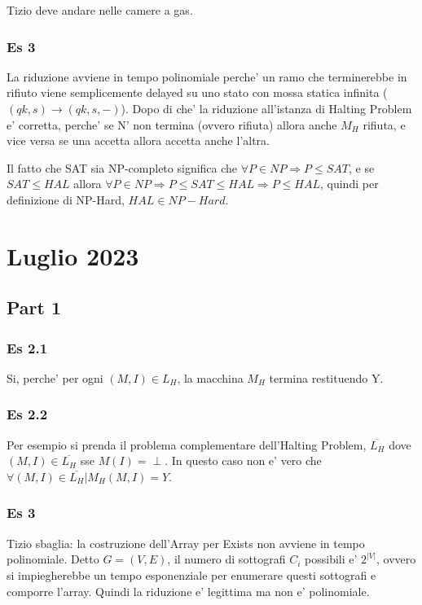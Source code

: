 \documentclass[a4paper,10pt,oneside]{book}
\begin{document}
Tizio deve andare nelle camere a gas.

\subsection{Es 3}

La riduzione avviene in tempo polinomiale perche' un ramo che terminerebbe in rifiuto viene semplicemente delayed su uno stato con mossa statica infinita ($(qk,s) \rightarrow (qk,s,-)$). Dopo di che' la riduzione all'istanza di Halting Problem e' corretta, perche' se N' non termina (ovvero rifiuta) allora anche $M_H$ rifiuta, e vice versa se una accetta allora accetta anche l'altra.

Il fatto che SAT sia NP-completo significa che $\forall P \in NP \Rightarrow P \leq SAT$, e se $SAT \leq HAL$ allora $\forall P \in NP \Rightarrow P \leq SAT \leq HAL \Rightarrow P \leq HAL$, quindi per definizione di NP-Hard, $HAL \in NP-Hard$.

\chapter{Luglio 2023}

\section{Part 1}

\subsection{Es 2.1}

Si, perche' per ogni $(M,I) \in L_H$, la macchina $M_H$ termina restituendo Y.

\subsection{Es 2.2}

Per esempio si prenda il problema complementare dell'Halting Problem, $\overline {L_H}$ dove $(M,I) \in \overline {L_H}$ sse $M(I) = \perp$. In questo caso non e' vero che $\forall (M,I) \in \overline {L_H} | M_H(M, I) = Y$.

\subsection{Es 3}

Tizio sbaglia: la costruzione dell'Array per Exists non avviene in tempo polinomiale. Detto $G = (V, E)$, il numero di sottografi $C_i$ possibili e' $2^{|V|}$, ovvero si impiegherebbe un tempo esponenziale per enumerare questi sottografi e comporre l'array. Quindi la riduzione e' legittima ma non e' polinomiale.
\end{document}
